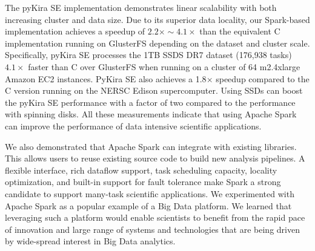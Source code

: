 \documentclass[10pt,journal,compsoc]{IEEEtran}
\begin{document}
The pyKira SE implementation demonstrates linear scalability with both increasing cluster and data
size. Due to its superior data locality, our Spark-based implementation achieves a speedup of $2.2\times\sim4.1\times$ than the equivalent C 
implementation running on GlusterFS depending on the dataset and cluster scale. 
Specifically, pyKira SE processes the 1TB SSDS DR7 dataset (176,938 tasks)
$4.1\times$ faster than C over GlusterFS when running on a cluster of 64 m2.4xlarge Amazon EC2 instances. 
PyKira SE also achieves a 1.8$\times$ speedup compared to the C version running on the NERSC Edison supercomputer.  
Using SSDs can boost the pyKira SE performance with a factor of two compared to the performance with spinning disks.
All these measurements indicate that using Apache Spark can improve the performance of data intensive scientific applications.

We also demonstrated that Apache Spark can integrate with existing libraries.
This allows users to reuse existing source code to build new analysis pipelines.
A flexible interface, rich dataflow support, task scheduling capacity, locality optimization, and built-in support for fault tolerance make Spark a 
strong candidate to support many-task scientific applications. 
We experimented with Apache Spark as a popular example of a Big Data platform. We learned that
leveraging such a platform would enable scientists to benefit from the rapid pace of innovation 
and large range of systems and technologies that are being driven by wide-spread interest in Big Data analytics.




%
\end{document}
